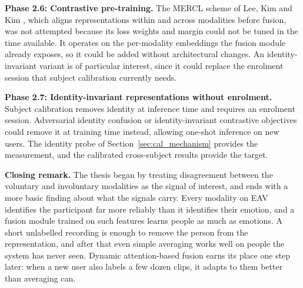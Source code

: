 \textbf{Phase 2.6: Contrastive pre-training.} The MERCL scheme of Lee, Kim and Kim \cite{Lee2024MERCL}, which aligns representations within and across modalities before fusion, was not attempted because its loss weights and margin could not be tuned in the time available. It operates on the per-modality embeddings the fusion module already exposes, so it could be added without architectural changes. An identity-invariant variant is of particular interest, since it could replace the enrolment session that subject calibration currently needs.

\textbf{Phase 2.7: Identity-invariant representations without enrolment.} Subject calibration removes identity at inference time and requires an enrolment session. Adversarial identity confusion or identity-invariant contrastive objectives could remove it at training time instead, allowing one-shot inference on new users. The identity probe of Section~\ref{sec:cal_mechanism} provides the measurement, and the calibrated cross-subject results provide the target.

\textbf{Closing remark.} The thesis began by treating disagreement between the voluntary and involuntary modalities as the signal of interest, and ends with a more basic finding about what the signals carry. Every modality on EAV identifies the participant far more reliably than it identifies their emotion, and a fusion module trained on such features learns people as much as emotions. A short unlabelled recording is enough to remove the person from the representation, and after that even simple averaging works well on people the system has never seen. Dynamic attention-based fusion earns its place one step later: when a new user also labels a few dozen clips, it adapts to them better than averaging can.